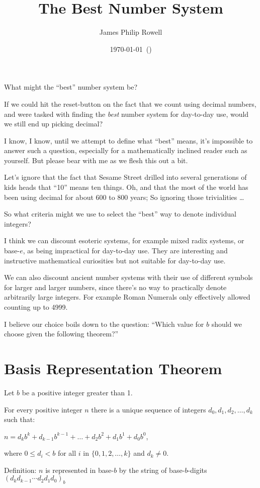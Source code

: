\documentclass{article}
\title{\vspace{-1.5cm}The Best Number System}
\author{James Philip Rowell}
\date{\vspace{-0.5cm}\footnotesize\today\ (\jprVersion)} %
\newenvironment{jprIn}{\begin{adjustwidth}{2em}{}}{\end{adjustwidth}}
\begin{document}
\maketitle
\begin{em}
\centerline{\small{}What might the ``best'' number system be?}
\end{em}

If we could hit the reset-button on the fact that we count
using decimal numbers, and were tasked with finding the \emph{best} number system for day-to-day use,
would we still end up picking decimal?

I know, I know, until we attempt to define what ``best'' means, it's impossible to
answer such a question, especially for a mathematically inclined reader such as yourself.
But please bear with me as we flesh this out a bit.

Let's ignore that the fact
that Sesame Street drilled into several generations of kids heads
that ``10'' means ten things. Oh, and that the most of the world
has been using decimal for about 600 to 800 years; So ignoring those
trivialities
\dots{}

So what criteria might we use to select the ``best'' way to denote individual integers?

I think we can discount esoteric systems, for example mixed radix systems,
or base-\(e\), as being impractical for day-to-day use. They are interesting
and instructive mathematical curiosities but not suitable for day-to-day use.

We can also discount ancient number systems with their 
use of
different symbols for larger and larger numbers, since there's no way to practically
denote arbitrarily large integers. 
For example Roman Numerals only effectively allowed counting up to 4999.

I believe our choice boils down to the question: ``Which value for \(b\) should we choose given the following theorem?''

\section*{Basis Representation Theorem}
\begin{jprIn}
Let $b$ be a positive integer greater than 1.

For every positive integer $n$ there is a unique sequence
of integers $d_0, d_1, d_2,\dots{},d_k$ such that:

\hspace{3em}$n=d_kb^k+d_{k-1}b^{k-1}+\dots+d_2b^2+d_1b^1+d_0b^0$,

where $0\le{}d_i<b$ for all $i$ in $\{0,1,2,\dots{},k\}$ and $d_k\ne0$.

Definition: $n$ is represented in base-$b$ by the string
of base-$b$-digits $(d_kd_{k-1}{\cdots}d_2d_1d_0)_b$
\end{jprIn}
\end{document}
